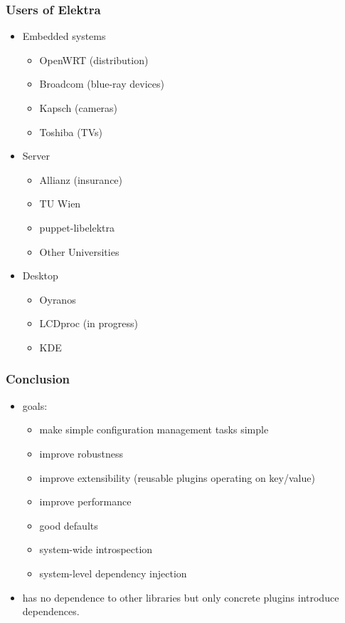 \begin{frame}
	\frametitle{Users of Elektra}
	\begin{itemize}[<+->]
	\item Embedded systems
	\begin{itemize}
	\item OpenWRT (distribution)
	\item Broadcom (blue-ray devices)
	\item Kapsch (cameras)
	\item Toshiba (TVs)
	\end{itemize}
	\item Server
	\begin{itemize}
	\item Allianz (insurance)
	\item TU Wien
	\item puppet-libelektra
	\item Other Universities
	\end{itemize}
	\item Desktop
	\begin{itemize}
	\item Oyranos
	\item LCDproc (in progress)
	\item KDE
	\end{itemize}
	\end{itemize}
\end{frame}

\begin{frame}
	\frametitle{Conclusion}
	\begin{itemize}
	\item goals:
		\begin{itemize}
		\item make simple configuration management tasks simple
		\item improve robustness
		\item improve extensibility (reusable plugins operating on key/value)
		\item improve performance
		\item good defaults
		\item system-wide introspection
		\item system-level dependency injection
		\end{itemize}
	\item \elektra{} has no dependence to other libraries but only concrete plugins introduce dependences.
	\end{itemize}
\end{frame}




\appendix

\begin{frame}[allowframebreaks]
	
	
\end{frame}



